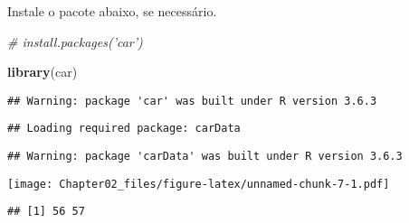 \documentclass[
]{article}
\newenvironment{Shaded}{\begin{snugshade}}{\end{snugshade}}
\newcommand{\CommentTok}[1]{\textcolor[rgb]{0.56,0.35,0.01}{\textit{#1}}}
\newcommand{\DataTypeTok}[1]{\textcolor[rgb]{0.13,0.29,0.53}{#1}}
\newcommand{\DecValTok}[1]{\textcolor[rgb]{0.00,0.00,0.81}{#1}}
\newcommand{\KeywordTok}[1]{\textcolor[rgb]{0.13,0.29,0.53}{\textbf{#1}}}
\newcommand{\NormalTok}[1]{#1}
\newcommand{\OperatorTok}[1]{\textcolor[rgb]{0.81,0.36,0.00}{\textbf{#1}}}
\newcommand{\StringTok}[1]{\textcolor[rgb]{0.31,0.60,0.02}{#1}}
\begin{document}
Instale o pacote abaixo, se necessário.

\begin{Shaded}
\begin{Highlighting}[]
\CommentTok{# install.packages('car')}
\end{Highlighting}
\end{Shaded}

\begin{Shaded}
\begin{Highlighting}[]
\KeywordTok{library}\NormalTok{(car)}
\end{Highlighting}
\end{Shaded}

\begin{verbatim}
## Warning: package 'car' was built under R version 3.6.3
\end{verbatim}

\begin{verbatim}
## Loading required package: carData
\end{verbatim}

\begin{verbatim}
## Warning: package 'carData' was built under R version 3.6.3
\end{verbatim}

\begin{Shaded}
\end{Shaded}

\texttt{[image: Chapter02\_files/figure-latex/unnamed-chunk-7-1.pdf]}

\begin{verbatim}
## [1] 56 57
\end{verbatim}
\end{document}
